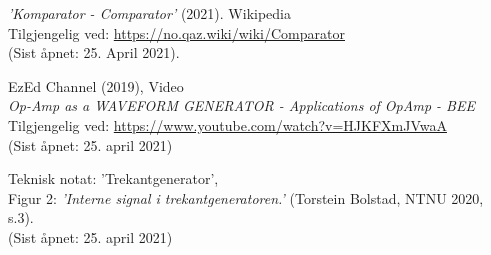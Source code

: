 \documentclass[a4paper,11pt,norsk]{article}
\begin{document}
{}
\begin{thebibliography}{99}

    \emph{'Komparator - Comparator'} (2021). Wikipedia\\
    Tilgjengelig ved: \href{https://no.qaz.wiki/wiki/Comparator}{https://no.qaz.wiki/wiki/Comparator}
    \\ (Sist åpnet: 25. April 2021).

    EzEd Channel (2019), Video \\
    \emph{Op-Amp as a WAVEFORM GENERATOR - Applications of OpAmp - BEE} \\
    Tilgjengelig ved: \href{https://www.youtube.com/watch?v=HJKFXmJVwaA}{https://www.youtube.com/watch?v=HJKFXmJVwaA} \\
    (Sist åpnet: 25. april 2021)

    Teknisk notat: 'Trekantgenerator', \\
    Figur 2: \emph{'Interne signal i trekantgeneratoren.'} (Torstein Bolstad, NTNU 2020, s.3). \\
    (Sist åpnet: 25. april 2021)




\end{thebibliography}

\appendix
\newpage
\end{document}
